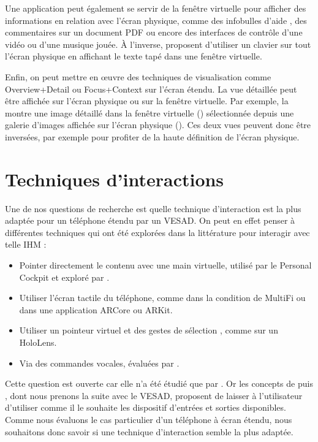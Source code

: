 Une application peut également se servir de la fenêtre virtuelle pour afficher des informations en relation avec l'écran physique, comme des infobulles d'aide , des commentaires sur un document PDF ou encore des interfaces de contrôle d'une vidéo ou d'une musique jouée. À l'inverse, \cite{Grubert2015} proposent d'utiliser un clavier sur tout l'écran physique en affichant le texte tapé dans une fenêtre virtuelle.

Enfin, on peut mettre en \oe uvre des techniques de visualisation comme Overview+Detail ou Focus+Context sur l'écran étendu. La vue détaillée peut être affichée sur l'écran physique ou sur la fenêtre virtuelle. Par exemple, la  montre une image détaillé dans la fenêtre virtuelle () sélectionnée depuis une galerie d'images affichée sur l'écran physique (). Ces deux vues peuvent donc être inversées, par exemple pour profiter de la haute définition de l'écran physique.


\section{Techniques d'interactions}
\label{sec:concept_interaction_techniques}

Une de nos questions de recherche  est quelle technique d'interaction est la plus adaptée pour un téléphone étendu par un VESAD. On peut en effet penser à différentes techniques qui ont été explorées dans la littérature pour interagir avec telle IHM :

\begin{itemize}
  \item Pointer directement le contenu avec une main virtuelle, utilisé par le Personal Cockpit \cite{Ens2014} et exploré par \cite{Piumsomboon2013}.
  \item Utiliser l'écran tactile du téléphone, comme dans la condition  de MultiFi \citep{Grubert2015} ou dans une application ARCore ou ARKit.
  \item Utiliser un pointeur virtuel et des gestes de sélection \cite{Wilson2006}, comme sur un HoloLens.
  \item Via des commandes vocales, évaluées par \cite{Piumsomboon2014}.
\end{itemize}
\medskip

Cette question est ouverte car elle n'a été étudié que par \cite{Grubert2015}. Or les concepts de \cite{Serrano2015} puis \cite{Serrano2015a}, dont nous prenons la suite avec le VESAD, proposent de laisser à l'utilisateur d'utiliser comme il le souhaite les dispositif d'entrées et sorties disponibles. Comme nous évaluons le cas particulier d'un téléphone à écran étendu, nous souhaitons donc savoir si une technique d'interaction semble la plus adaptée.

